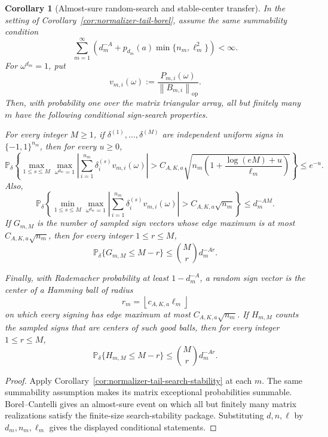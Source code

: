 \documentclass[11pt]{amsart}
\numberwithin{equation}{section}
\newtheorem{corollary}[theorem]{Corollary}
\theoremstyle{definition}
\theoremstyle{remark}
\newcommand{\op}{\mathrm{op}}
\newcommand{\Prob}{\mathbb P}
\newcommand{\norm}[1]{\left\lVert #1\right\rVert}
\begin{document}
\begin{corollary}[Almost-sure random-search and stable-center transfer]
\label{cor:normalizer-tail-borel-search-stability}
In the setting of Corollary~\ref{cor:normalizer-tail-borel}, assume the same
summability condition
\[
  \sum_{m=1}^{\infty}
  \left(d_m^{-A}+p_{d_m}(a)\min\{n_m,\ell_m^2\}\right)<\infty .
\]
For \(\omega^{d_m}=1\), put
\[
  v_{m,i}(\omega):=
  \frac{P_{m,i}(\omega)}{\norm{B_{m,i}}_{\op}} .
\]
Then, with probability one over the matrix triangular array, all but finitely
many \(m\) have the following conditional sign-search properties.

For every integer \(M\ge1\), if
\(\delta^{(1)},\ldots,\delta^{(M)}\) are independent uniform signs in
\(\{-1,1\}^{n_m}\), then for every \(u\ge0\),
\[
  \Prob_\delta\left\{
  \max_{1\le s\le M}\max_{\omega^{d_m}=1}
  \left|\sum_{i=1}^{n_m}\delta_i^{(s)}v_{m,i}(\omega)\right|
  >
  C_{A,K,a}\sqrt{
    n_m\left(1+\frac{\log(eM)+u}{\ell_m}\right)}
  \right\}
  \le e^{-u}.
\]
Also,
\[
  \Prob_\delta\left\{
  \min_{1\le s\le M}\max_{\omega^{d_m}=1}
  \left|\sum_{i=1}^{n_m}\delta_i^{(s)}v_{m,i}(\omega)\right|
  > C_{A,K,a}\sqrt {n_m}
  \right\}\le d_m^{-AM}.
\]
If \(G_{m,M}\) is the number of sampled sign vectors whose edge maximum is at
most \(C_{A,K,a}\sqrt{n_m}\), then for every integer \(1\le r\le M\),
\[
  \Prob_\delta\{G_{m,M}\le M-r\}\le \binom Mr d_m^{-Ar}.
\]

Finally, with Rademacher probability at least \(1-d_m^{-A}\), a random sign
vector is the center of a Hamming ball of radius
\[
  r_m=\left\lfloor c_{A,K,a}\ell_m\right\rfloor
\]
on which every signing has edge maximum at most \(C_{A,K,a}\sqrt{n_m}\).  If
\(H_{m,M}\) counts the sampled signs that are centers of such good balls, then
for every integer \(1\le r\le M\),
\[
  \Prob_\delta\{H_{m,M}\le M-r\}\le \binom Mr d_m^{-Ar}.
\]
\end{corollary}

\begin{proof}
Apply Corollary~\ref{cor:normalizer-tail-search-stability} at each \(m\).  The
same summability assumption makes its matrix exceptional probabilities
summable.  Borel--Cantelli gives an almost-sure event on which all but finitely
many matrix realizations satisfy the finite-size search-stability package.
Substituting \(d,n,\ell\) by \(d_m,n_m,\ell_m\) gives the displayed conditional
statements.
\end{proof}
\end{document}
